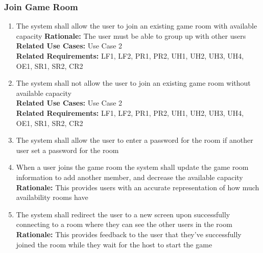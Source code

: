 \documentclass[12pt]{article}
\begin{document}
\subsubsection{Join Game Room}
\begin{enumerate}[label=JG\arabic*., series=JoinGame]
	\item The system shall allow the user to join an existing game room with available capacity \newline 
    \textbf{Rationale:} The user must be able to group up with other users\\
    \textbf{Related Use Cases:} Use Case 2\\
    \textbf{Related Requirements:} LF1, LF2, PR1, PR2, UH1, UH2, UH3, UH4, OE1, SR1, SR2, CR2
    
    \item The system shall not allow the user to join an existing game room without available capacity\\
    \textbf{Related Use Cases:} Use Case 2\\
    \textbf{Related Requirements:} LF1, LF2, PR1, PR2, UH1, UH2, UH3, UH4, OE1, SR1, SR2, CR2
    
    \item The system shall allow the user to enter a password for the room if another user set a password for the room 
    \item When a user joins the game room the system shall update the game room information to add another member, and decrease the available capacity\newline 
    \textbf{Rationale:} This provides users with an accurate representation of how much availability rooms have
    \item The system shall redirect the user to a new screen upon successfully connecting to a room where they can see the other users in the room\newline 
    \textbf{Rationale:} This provides feedback to the user that they've successfully joined the room while they wait for the host to start the game
\end{enumerate}
\end{document}
